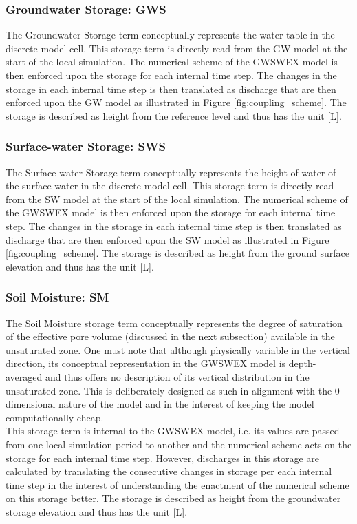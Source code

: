 \subsubsection*{Groundwater Storage: GWS}
The Groundwater Storage term conceptually represents the water table in the discrete model cell. This storage term is directly read from the GW model at the start of the local simulation. The numerical scheme of the GWSWEX model is then enforced upon the storage for each internal time step. The changes in the storage in each internal time step is then translated as discharge that are then enforced upon the GW model as illustrated in Figure \ref{fig:coupling_scheme}. The storage is described as height from the reference level and thus has the unit [L].

\subsubsection*{Surface-water Storage: SWS}
The Surface-water Storage term conceptually represents the height of water of the surface-water in the discrete model cell. This storage term is directly read from the SW model at the start of the local simulation. The numerical scheme of the GWSWEX model is then enforced upon the storage for each internal time step. The changes in the storage in each internal time step is then translated as discharge that are then enforced upon the SW model as illustrated in Figure \ref{fig:coupling_scheme}. The storage is described as height from the ground surface elevation and thus has the unit [L].

\subsubsection*{Soil Moisture: SM}
The Soil Moisture storage term conceptually represents the degree of saturation of the effective pore volume (discussed in the next subsection) available in the unsaturated zone. One must note that although physically variable in the vertical direction, its conceptual representation in the GWSWEX model is depth-averaged and thus offers no description of its vertical distribution in the unsaturated zone. This is deliberately designed as such in alignment with the 0-dimensional nature of the model and in the interest of keeping the model computationally cheap.
\\
This storage term is internal to the GWSWEX model, i.e. its values are passed from one local simulation period to another and the numerical scheme acts on the storage for each internal time step. However, discharges in this storage are calculated by translating the consecutive changes in storage per each internal time step in the interest of understanding the enactment of the numerical scheme on this storage better. The storage is described as height from the groundwater storage elevation and thus has the unit [L].
